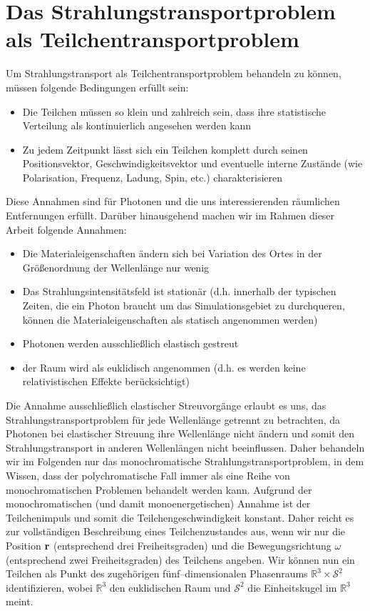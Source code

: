 	\section{Das Strahlungstransportproblem als Teilchentransportproblem}
	Um Strahlungstransport als Teilchentransportproblem behandeln zu können, müssen folgende Bedingungen erfüllt sein:
	\begin{itemize}
		\item{Die Teilchen müssen so klein und zahlreich sein, dass ihre statistische Verteilung als kontinuierlich angesehen werden kann}
		\item{Zu jedem Zeitpunkt lässt sich ein Teilchen komplett durch seinen Positionsvektor, Geschwindigkeitsvektor und eventuelle interne Zustände (wie Polarisation, Frequenz, Ladung, Spin, etc.) charakterisieren}
	\end{itemize}
	Diese Annahmen sind für Photonen und die uns interessierenden räumlichen Entfernungen erfüllt.
	Darüber hinausgehend machen wir im Rahmen dieser Arbeit folgende Annahmen:
	\begin{itemize}
		\item{Die Materialeigenschaften ändern sich bei Variation des Ortes in der Größenordnung der Wellenlänge nur wenig}
		\item{Das Strahlungsintensitätsfeld ist stationär (d.h. innerhalb der typischen Zeiten, die ein Photon braucht um das Simulationsgebiet zu durchqueren, können die Materialeigenschaften als statisch angenommen werden)}
		\item{Photonen werden ausschließlich elastisch gestreut}
		\item{der Raum wird als euklidisch angenommen (d.h. es werden keine relativistischen Effekte berücksichtigt)}
	\end{itemize}
	Die Annahme ausschließlich elastischer Streuvorgänge erlaubt es uns, das Strahlungstransportproblem für jede Wellenlänge getrennt zu betrachten, da Photonen bei elastischer Streuung ihre Wellenlänge nicht ändern und somit den Strahlungstransport in anderen Wellenlängen nicht beeinflussen. Daher behandeln wir im Folgenden nur das monochromatische Strahlungstransportproblem, in dem Wissen, dass der polychromatische Fall immer als eine Reihe von monochromatischen Problemen behandelt werden kann. Aufgrund der monochromatischen (und damit monoenergetischen) Annahme ist der Teilchenimpuls und somit die Teilchengeschwindigkeit konstant. Daher reicht es zur vollständigen Beschreibung eines Teilchenzustandes aus, wenn wir nur die Position $\mathbf{r}$ (entsprechend drei Freiheitsgraden) und die Bewegungsrichtung $\omega$ (entsprechend zwei Freiheitsgraden) des Teilchens angeben. Wir können nun ein Teilchen als Punkt des zugehörigen fünf--dimensionalen Phasenraums $\mathbb{R}^3 \times \mathcal{S}^2$ identifizieren, wobei $\mathbb{R}^3$ den euklidischen Raum und $\mathcal{S}^2$ die Einheitskugel im $\mathbb{R}^3$ meint.
	
